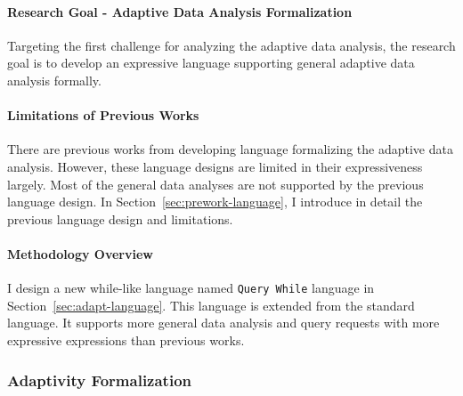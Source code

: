 \paragraph*{Research Goal - Adaptive Data Analysis Formalization}
Targeting the first challenge
for analyzing the adaptive data analysis, 
the research goal is to develop
an expressive language supporting general adaptive data analysis formally.

\paragraph*{Limitations of Previous Works}
There are previous works from \cite{weihao22} developing language formalizing the adaptive data analysis.
However, these language designs are limited in their expressiveness largely.
Most of the general data analyses are not supported by the previous language design.
In Section~\ref{sec:prework-language}, I introduce in detail the previous language design and limitations.
%
\paragraph*{Methodology Overview}
I design a new while-like language 
named {\tt Query While} language in Section~\ref{sec:adapt-language}.
This language is extended from the standard language.
It supports more general data analysis and query requests with more expressive expressions than previous works.

\subsubsection{Adaptivity Formalization}
\label{sec:intro-exe}
